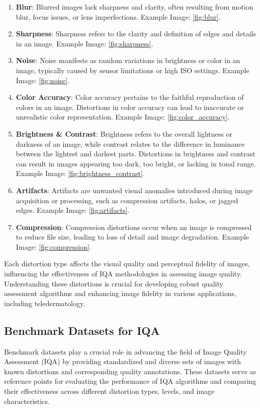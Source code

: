 \begin{enumerate}
    \item \textbf{Blur}: Blurred images lack sharpness and clarity, often resulting from motion blur, focus issues, or lens imperfections. Example Image: \ref{fig:blur}.
    
    \item \textbf{Sharpness}: Sharpness refers to the clarity and definition of edges and details in an image. Example Image: \ref{fig:sharpness}.
    
    \item \textbf{Noise}: Noise manifests as random variations in brightness or color in an image, typically caused by sensor limitations or high ISO settings. Example Image: \ref{fig:noise}.
    
    \item \textbf{Color Accuracy}: Color accuracy pertains to the faithful reproduction of colors in an image. Distortions in color accuracy can lead to inaccurate or unrealistic color representation. Example Image: \ref{fig:color_accuracy}.
    
    \item \textbf{Brightness \& Contrast}: Brightness refers to the overall lightness or darkness of an image, while contrast relates to the difference in luminance between the lightest and darkest parts. Distortions in brightness and contrast can result in images appearing too dark, too bright, or lacking in tonal range. Example Image: \ref{fig:brightness_contrast}.
    
    \item \textbf{Artifacts}: Artifacts are unwanted visual anomalies introduced during image acquisition or processing, such as compression artifacts, halos, or jagged edges. Example Image: \ref{fig:artifacts}.
    
    \item \textbf{Compression}: Compression distortions occur when an image is compressed to reduce file size, leading to loss of detail and image degradation. Example Image: \ref{fig:compression}.
\end{enumerate}
Each distortion type affects the visual quality and perceptual fidelity of images, influencing the effectiveness of IQA methodologies in assessing image quality. Understanding these distortions is crucial for developing robust quality assessment algorithms and enhancing image fidelity in various applications, including teledermatology.

\subsection{Benchmark Datasets for IQA}
\label{sub:BenchmarkDatasetsIQA}
Benchmark datasets play a crucial role in advancing the field of Image Quality Assessment (IQA) by providing standardized and diverse sets of images with known distortions and corresponding quality annotations. These datasets serve as reference points for evaluating the performance of IQA algorithms and comparing their effectiveness across different distortion types, levels, and image characteristics. \par


